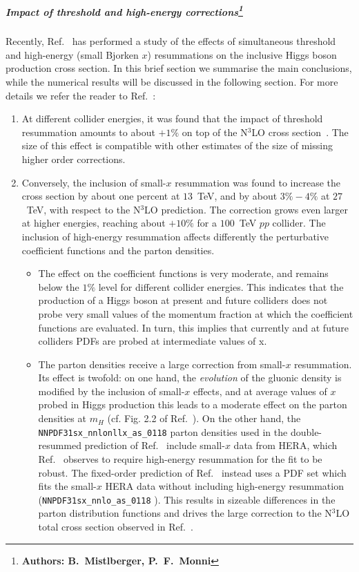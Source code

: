 \subparagraph{Impact of threshold and high-energy
  corrections\footnote{\bf Authors: B.~Mistlberger, P.~F.~Monni}}
Recently, Ref.~\cite{Bonvini:2018ixe} has performed a study of the
effects of simultaneous threshold and high-energy (small Bjorken $x$)
resummations on the inclusive Higgs boson production cross section. In this brief
section we summarise the main conclusions, while the numerical results
will be discussed in the following section. For more details we refer
the reader to Ref.~\cite{Bonvini:2018ixe}:
\begin{enumerate}
\item At different collider energies, it was found that the impact of
  threshold resummation amounts to about $+1\%$ on top of the N$^3$LO
  cross section~\cite{Bonvini:2016frm}. The size of this effect is
  compatible with other estimates of the size of missing higher order
  corrections.
\item Conversely, the inclusion of small-$x$ resummation was found to
  increase the cross section by about one percent at $13$~TeV, and by
  about $3\%-4\%$ at $27$~TeV, with respect to the N$^3$LO
  prediction. The correction grows even larger at higher 
  energies, reaching about $+10\%$ for a $100$~TeV $pp$ collider. The
  inclusion of high-energy resummation affects differently the
  perturbative coefficient functions and the parton densities.
\begin{itemize}
\item The effect on the coefficient functions is very moderate, and
  remains below the $1\%$ level for different collider energies. This
  indicates that the production of a Higgs boson at present and future
  colliders does not probe very small values of the momentum fraction
  at which the coefficient functions are evaluated.
  In turn, this implies that currently and at future colliders PDFs are probed at intermediate values of x.

\item The parton densities receive a large correction from small-$x$
  resummation. Its effect is twofold: on one hand, the {\it evolution}
  of the gluonic density is modified by the inclusion of small-$x$
  effects, and at average values of $x$ probed in Higgs production
  this leads to a moderate effect on the parton densities at $m_H$
  (cf. Fig. 2.2 of Ref.~\cite{Ball:2017otu}). On the other hand, the
  \verb+NNPDF31sx_nnlonllx_as_0118+
  \cite{Ball:2017otu} parton densities used in the double-resummed prediction of
  Ref.~\cite{Bonvini:2018ixe}  include small-$x$ data from HERA, which
  Ref.~\cite{Ball:2017otu} observes to require high-energy resummation
  for the fit to be robust. The fixed-order prediction of
  Ref.~\cite{Bonvini:2018ixe} instead uses a PDF set which fits the
  small-$x$ HERA data without including high-energy resummation
  (\verb+NNPDF31sx_nnlo_as_0118+ \cite{Ball:2017otu}).  This results
  in sizeable differences in the parton distribution functions and
  drives the large correction to the N$^3$LO total cross section
  observed in Ref.~\cite{Bonvini:2018ixe}.
\end{itemize}
\end{enumerate}
